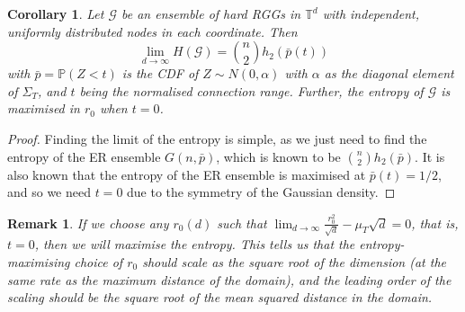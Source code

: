 \documentclass{article}
\newtheorem{corollary}{Corollary}
\newtheorem{remark}{Remark}
\newcommand{\tti}{\rightarrow\infty}
\newcommand{\graph}{\mathcal{G}}
\newcommand{\prob}[1]{\mathbb{P}\left(#1\right)}
\begin{document}
\begin{corollary}
    \label{thm:torus_is_ER}
    Let $\mathcal{G}$ be an ensemble of hard RGGs in $\mathbb{T}^d$ with independent, uniformly distributed nodes in each coordinate. Then
    \begin{equation}
        \lim_{d\tti} H(\mathcal{G}) = \binom{n}{2}h_2(\bar{p}(t))
    \end{equation}
    with $\bar{p} = \prob{Z<t}$ is the CDF of $Z \sim N(0, \alpha)$ with $\alpha$ as the diagonal element of $\Sigma_T$, and $t$ being the normalised connection range. Further, the entropy of $\graph$ is maximised in $r_0$ when $t=0$.
\end{corollary}
\begin{proof}
    Finding the limit of the entropy is simple, as we just need to find the entropy of the ER ensemble $G(n,\bar{p})$, which is known to be $\binom{n}{2}h_2(\bar{p})$. It is also known that the entropy of the ER ensemble is maximised at $\bar{p}(t)=1/2$, and so we need $t=0$ due to the symmetry of the Gaussian density. 
\end{proof}
\begin{remark}
    If we choose any $r_0(d)$ such that $\lim_{d\tti} \frac{r_0^2}{\sqrt{d}}-\mu_T\sqrt{d} = 0$, that is, $t = 0$, then we will maximise the entropy.  This tells us that the entropy-maximising choice of $r_0$ should scale as the square root of the dimension (at the same rate as the maximum distance of the domain), and the leading order of the scaling should be the square root of the mean squared distance in the domain.
\end{remark} 
\end{document}
